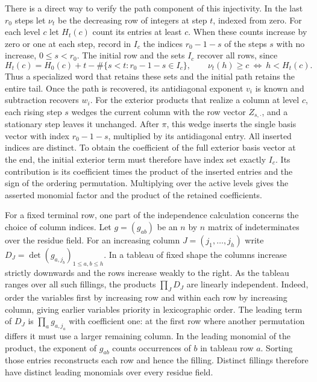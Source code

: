 \documentclass[11pt]{amsart}
\theoremstyle{definition}
\theoremstyle{remark}
\begin{document}
There is a direct way to verify the path component of this
injectivity. In the last $r_0$ steps let $\nu_t$ be the decreasing
row of integers at step $t$, indexed from zero. For each level $c$
let $H_t(c)$ count its entries at least $c$. When these counts
increase by zero or one at each step, record in $I_c$ the indices
$r_0-1-s$ of the steps $s$ with no increase, $0\le s<r_0$.
The initial row and the sets $I_c$ recover all rows, since
\[
 H_t(c)=H_0(c)+t-
 \#\{s<t:r_0-1-s\in I_c\},\qquad
 \nu_t(h)\ge c\ \Longleftrightarrow\ h<H_t(c).
\]
Thus a specialized word that retains these sets and the initial
path retains the entire tail. Once the path is recovered, its
antidiagonal exponent $v_i$ is known and subtraction recovers $w_i$.
For the exterior products that realize a column at level $c$,
each rising step $s$ wedges the current column with the row
vector $Z_{s,\cdot}$, and a stationary step leaves it unchanged.
After $\pi$, this wedge inserts the single basis vector with index
$r_0-1-s$, multiplied by its antidiagonal entry. All inserted
indices are distinct. To obtain the coefficient of the full
exterior basis vector at the end, the initial exterior term must
therefore have index set exactly $I_c$. Its contribution is its
coefficient times the product of the inserted entries and the sign
of the ordering permutation. Multiplying over the active levels
gives the asserted monomial factor and the product of the retained
coefficients.

For a fixed terminal row, one part of the independence calculation
concerns the choice of column indices. Let $g=(g_{ab})$ be an
$n$ by $n$ matrix of indeterminates over the residue field.
For an increasing column $J=(j_1,\ldots,j_h)$ write
$D_J=\det(g_{a,j_b})_{1\le a,b\le h}$. In a tableau of fixed
shape the columns increase strictly downwards and the rows increase
weakly to the right. As the tableau ranges over all such fillings,
the products $\prod_J D_J$ are linearly independent. Indeed,
order the variables first by increasing row and within each row by
increasing column, giving earlier variables priority in lexicographic
order. The leading term of $D_J$ is $\prod_a g_{a,j_a}$ with
coefficient one: at the first row where another permutation differs
it must use a larger remaining column. In the leading monomial of
the product, the exponent of $g_{ab}$ counts occurrences of $b$
in tableau row $a$. Sorting those entries reconstructs each row and
hence the filling. Distinct fillings therefore have distinct leading
monomials over every residue field.
\end{document}
